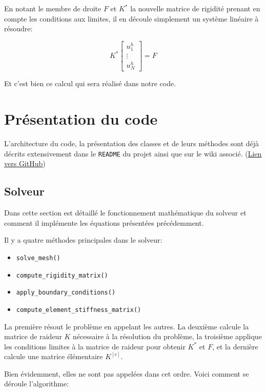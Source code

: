 \documentclass{article}
\begin{document}
En notant le membre de droite $F$ et $K^*$ la nouvelle
matrice de rigidité prenant en compte les conditions aux limites,
il en découle simplement un système linéaire à résoudre:

\begin{equation}
    K^*
    \begin{bmatrix}
        u^h_1 \\ \vdots \\ u^h_N
    \end{bmatrix}
    = F
\end{equation}

Et c'est bien ce calcul qui sera réalisé dans notre code.

\newpage

\section{Présentation du code}

L'architecture du code, la présentation des classes et de leurs
méthodes sont déjà décrits extensivement dans le \verb|README|
du projet ainsi que sur le wiki associé.
(\href{https://github.com/LuciferC-137/FiniteElementElec}{Lien vers GitHub})

\subsection{Solveur}

Dans cette section est détaillé le fonctionnement
mathématique du solveur et comment il implémente les équations
présentées précédemment.

Il y a quatre méthodes principales dans le solveur:

\begin{itemize}
    \item \verb|solve_mesh()|
    \item \verb|compute_rigidity_matrix()|
    \item \verb|apply_boundary_conditions()|
    \item \verb|compute_element_stiffness_matrix()|
\end{itemize}

La première résout le problème en appelant les autres.
La deuxième calcule la matrice de raideur $K$ nécessaire à la
résolution du problème, la troisième applique les conditions
limites à la matrice de raideur pour obtenir $K^*$ et $F$, et la dernière calcule
une matrice élémentaire $K^{[e]}$.

Bien évidemment, elles ne sont pas appelées dans cet ordre. Voici
comment se déroule l'algorithme:
\end{document}
